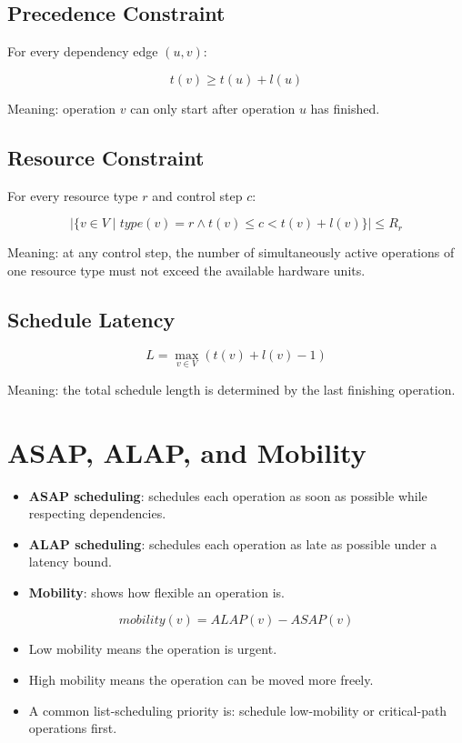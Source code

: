 \documentclass[11pt,a4paper]{article}
\begin{document}
\subsection*{Precedence Constraint}

For every dependency edge $(u,v)$:

\[
t(v) \geq t(u) + l(u)
\]

Meaning: operation $v$ can only start after operation $u$ has finished.

\subsection*{Resource Constraint}

For every resource type $r$ and control step $c$:

\[
\left| \{ v \in V \mid type(v)=r \land t(v) \leq c < t(v)+l(v) \} \right| \leq R_r
\]

Meaning: at any control step, the number of simultaneously active operations of one resource type must not exceed the available hardware units.

\subsection*{Schedule Latency}

\[
L = \max_{v \in V}(t(v)+l(v)-1)
\]

Meaning: the total schedule length is determined by the last finishing operation.

\section{ASAP, ALAP, and Mobility}

\begin{itemize}[leftmargin=*]
    \item \textbf{ASAP scheduling}: schedules each operation as soon as possible while respecting dependencies.
    \item \textbf{ALAP scheduling}: schedules each operation as late as possible under a latency bound.
    \item \textbf{Mobility}: shows how flexible an operation is.
\end{itemize}

\[
mobility(v)=ALAP(v)-ASAP(v)
\]

\begin{itemize}[leftmargin=*]
    \item Low mobility means the operation is urgent.
    \item High mobility means the operation can be moved more freely.
    \item A common list-scheduling priority is: schedule low-mobility or critical-path operations first.
\end{itemize}
\end{document}
